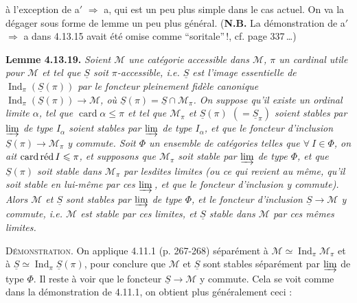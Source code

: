 \documentclass[11pt]{article}
\newcommand{\printedpage}[1]{\marginpar{\footnotesize p.~#1}}
\newcommand{\msp}[1]{\marginpar{\footnotesize [#1]}}
\newcommand{\Ind}{\operatorname{Ind}}
\newcommand{\card}{\operatorname{card}}
\newcommand{\cardred}{\mathop{\textup{card\,réd}}\nolimits}
\begin{document}
\setcounter{footnote}{143}

\printedpage{129}

\msp{page 340}
à l'exception de a$'$ $\Longrightarrow$ a, qui est un peu plus simple dans le cas actuel. On va la dégager sous forme de lemme un peu plus général. (\textbf{N.B.} La démonstration de a$'$ $\Longrightarrow$ a dans 4.13.15 avait été omise comme “soritale”\,!, cf. page 337\,\dots)

\textbf{Lemme 4.13.19.} \textit{Soient $\mathcal{M}$ une catégorie accessible dans $\mathcal{M}$, $\pi$ un cardinal utile pour $\mathcal{M}$ et tel que $\underline{S}$ soit $\pi$-accessible, i.e. $\underline{S}$ est l'image essentielle de $\Ind_\pi(\underline{S}(\pi))$ par le foncteur pleinement fidèle canonique $\Ind_\pi(\underline{S}(\pi))\longrightarrow\mathcal{M}$, où $\underline{S}(\pi)=\underline{S}\cap\mathcal{M}_\pi$. On suppose qu'il existe un ordinal limite $\alpha$, tel que $\card\alpha\leqslant\pi$ et tel que $\mathcal{M}_\pi$ et $\underline{S}(\pi)$ $(=\underline{S}_\pi)$ soient stables par $\varinjlim$ de type $I_\alpha$ soient stables par $\varinjlim$ de type $I_\alpha$, et que le foncteur d'inclusion $\underline{S}(\pi)\longrightarrow\mathcal{M}_\pi$ y commute. Soit $\Phi$ un ensemble de catégories telles que $\forall\ I\in\Phi$, on ait $\cardred I\leqslant\pi$, et supposons que $\mathcal{M}_\pi$ soit stable par $\varinjlim$ de type $\Phi$, et que $\underline{S}(\pi)$ soit stable dans $\mathcal{M}_\pi$ par lesdites limites (ou ce qui revient au même, qu'il soit stable en lui-même par ces $\varinjlim$\,, et que le foncteur d'inclusion y commute). Alors $\mathcal{M}$ et $\underline{S}$ sont stables par $\varinjlim$ de type $\Phi$, et le foncteur d'inclusion $\underline{S}\longrightarrow\mathcal{M}$ y commute, i.e. $\mathcal{M}$ est stable par ces limites, et $\underline{S}$ stable dans $\mathcal{M}$ par ces mêmes limites.} %

\msp{page 341}
\textsc{Démonstration}. On applique 4.11.1 (p. 267-268) séparément à $\mathcal{M}\simeq\Ind_\pi\mathcal{M}_\pi$ et à $\underline{S}\simeq\Ind_\pi\underline{S}(\pi)$, pour conclure que $\mathcal{M}$ et $\underline{S}$ sont stables séparément par $\varinjlim$ de type $\Phi$. Il reste à voir que le foncteur $\underline{S}\longrightarrow\mathcal{M}$ y commute. Cela se voit comme dans la démonstration de 4.11.1, on obtient plus généralement ceci :
\end{document}
